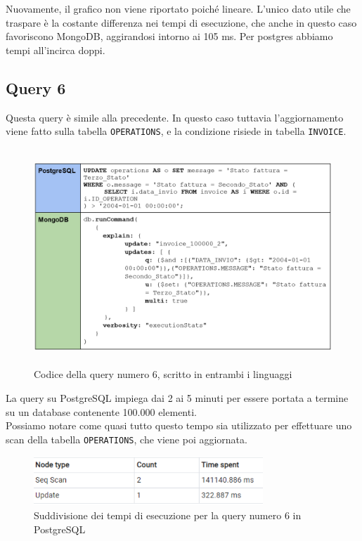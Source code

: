 \noindent Nuovamente, il grafico non viene riportato poiché lineare. L'unico dato utile che traspare è la costante differenza nei tempi di esecuzione, che anche in questo caso favoriscono MongoDB, aggirandosi intorno ai 105 ms. Per postgres abbiamo tempi all'incirca doppi.\\


\subsection{Query 6}
Questa query è simile alla precedente. In questo caso tuttavia l'aggiornamento viene fatto sulla tabella \texttt{OPERATIONS}, e la condizione risiede in tabella \texttt{INVOICE}.\\

\begin{figure}[htbp]
\begin{center}
\includegraphics[height=22em]{immagini/query/query6.png}
\caption{Codice della query numero 6, scritto in entrambi i linguaggi}
\end{center}
\end{figure}

\noindent La query su PostgreSQL impiega dai 2 ai 5 minuti per essere portata a termine su un database contenente 100.000 elementi.\\
Possiamo notare come quasi tutto questo tempo sia utilizzato per effettuare uno scan della tabella \texttt{OPERATIONS}, che viene poi aggiornata.\\

\begin{figure}[htbp]
\begin{center}
\includegraphics[height=5em]{immagini/query/query6_results.png}
\caption{Suddivisione dei tempi di esecuzione per la query numero 6 in PostgreSQL}
\end{center}
\end{figure}

